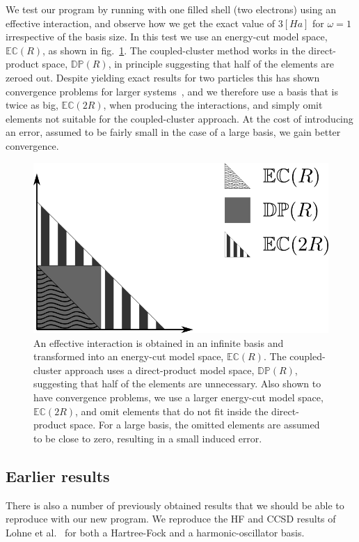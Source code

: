We test our program by running with one filled shell (two electrons) using an effective interaction, and observe how we get the exact value of $3[Ha]$ for $\omega=1$ irrespective of the basis size.
In this test we use an energy-cut model space, $\mathbb{EC}(R)$, as shown in fig.~\ref{fig:results:energycut}.
The coupled-cluster method works in the direct-product space, $\mathbb{DP}(R)$, in principle suggesting that half of the elements are zeroed out.
Despite yielding exact results for two particles this has shown convergence problems for larger systems~\cite{mplohne}, and we therefore use a basis that is twice as big, $\mathbb{EC}(2R)$, when producing the interactions, and simply omit elements not suitable for the coupled-cluster approach.
At the cost of introducing an error, assumed to be fairly small in the case of a large basis, we gain better convergence.
\begin{figure}
\begin{center}
\includegraphics[scale=1.0]{../10-results/figs/modelSpace.png}
\caption{An effective interaction is obtained in an infinite basis and transformed into an energy-cut model space, $\mathbb{EC}(R)$. The coupled-cluster approach uses a direct-product model space, $\mathbb{DP}(R)$, suggesting that half of the elements are unnecessary. Also shown to have convergence problems, we use a larger energy-cut model space, $\mathbb{EC}(2R)$, and omit elements that do not fit inside the direct-product space. For a large basis, the omitted elements are assumed to be close to zero, resulting in a small induced error.}
\label{fig:results:energycut}
\end{center}
\end{figure}



\subsection{Earlier results}
There is also a number of previously obtained results that we should be able to reproduce with our new program. We reproduce the HF and CCSD results of Lohne et al.~\cite{PhysRevB.84.115302} for both a Hartree-Fock and a harmonic-oscillator basis.

